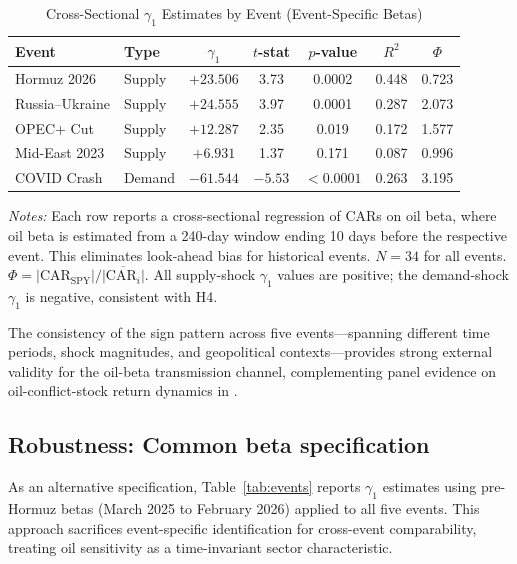 \documentclass[12pt,preprint,authoryear]{elsarticle}
\begin{document}
\begin{table}[H]
\centering
\caption{Cross-Sectional $\gamma_1$ Estimates by Event (Event-Specific Betas)}
\label{tab:eventbetas}
\begin{threeparttable}
\begin{tabular}{llccccc}
\toprule
Event & Type & $\gamma_1$ & $t$-stat & $p$-value & $R^2$ & $\Phi$ \\
\midrule
Hormuz 2026 & Supply & $+23.506$ & 3.73 & 0.0002 & 0.448 & 0.723 \\
Russia--Ukraine & Supply & $+24.555$ & 3.97 & 0.0001 & 0.287 & 2.073 \\
OPEC+ Cut & Supply & $+12.287$ & 2.35 & 0.019 & 0.172 & 1.577 \\
Mid-East 2023 & Supply & $+6.931$ & 1.37 & 0.171 & 0.087 & 0.996 \\
\midrule
COVID Crash & Demand & $-61.544$ & $-5.53$ & $<0.0001$ & 0.263 & 3.195 \\
\bottomrule
\end{tabular}
\begin{tablenotes}[flushleft]\footnotesize
\item \textit{Notes:} Each row reports a cross-sectional regression of CARs on oil beta, where oil beta is estimated from a 240-day window ending 10 days before the respective event. This eliminates look-ahead bias for historical events. $N = 34$ for all events. $\Phi = |\text{CAR}_{\text{SPY}}| / \overline{|\text{CAR}_i|}$. All supply-shock $\gamma_1$ values are positive; the demand-shock $\gamma_1$ is negative, consistent with H4.
\end{tablenotes}
\end{threeparttable}
\end{table}

The consistency of the sign pattern across five events---spanning different time periods, shock magnitudes, and geopolitical contexts---provides strong external validity for the oil-beta transmission channel, complementing panel evidence on oil-conflict-stock return dynamics in \citet{dong2024interplay}.

\subsection{Robustness: Common beta specification}
As an alternative specification, Table~\ref{tab:events} reports $\gamma_1$ estimates using pre-Hormuz betas (March 2025 to February 2026) applied to all five events. This approach sacrifices event-specific identification for cross-event comparability, treating oil sensitivity as a time-invariant sector characteristic.
\end{document}

